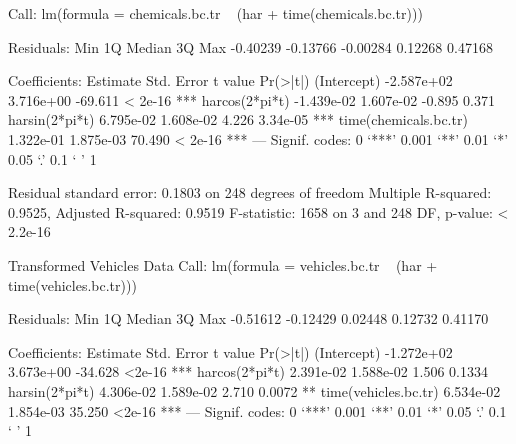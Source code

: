 \begin{enumerate}[label=(\roman*)]
\begin{block}
Call:
lm(formula = chemicals.bc.tr ~ (har + time(chemicals.bc.tr)))

Residuals:
     Min       1Q   Median       3Q      Max 
-0.40239 -0.13766 -0.00284  0.12268  0.47168 

Coefficients:
                        Estimate Std. Error t value Pr(>|t|)    
(Intercept)           -2.587e+02  3.716e+00 -69.611  < 2e-16 ***
harcos(2*pi*t)        -1.439e-02  1.607e-02  -0.895    0.371    
harsin(2*pi*t)         6.795e-02  1.608e-02   4.226 3.34e-05 ***
time(chemicals.bc.tr)  1.322e-01  1.875e-03  70.490  < 2e-16 ***
---
Signif. codes:  0 ‘***’ 0.001 ‘**’ 0.01 ‘*’ 0.05 ‘.’ 0.1 ‘ ’ 1

Residual standard error: 0.1803 on 248 degrees of freedom
Multiple R-squared:  0.9525,	Adjusted R-squared:  0.9519 
F-statistic:  1658 on 3 and 248 DF,  p-value: < 2.2e-16

Transformed Vehicles Data
Call:
lm(formula = vehicles.bc.tr ~ (har + time(vehicles.bc.tr)))

Residuals:
     Min       1Q   Median       3Q      Max 
-0.51612 -0.12429  0.02448  0.12732  0.41170 

Coefficients:
                       Estimate Std. Error t value Pr(>|t|)    
(Intercept)          -1.272e+02  3.673e+00 -34.628   <2e-16 ***
harcos(2*pi*t)        2.391e-02  1.588e-02   1.506   0.1334    
harsin(2*pi*t)        4.306e-02  1.589e-02   2.710   0.0072 ** 
time(vehicles.bc.tr)  6.534e-02  1.854e-03  35.250   <2e-16 ***
---
Signif. codes:  0 ‘***’ 0.001 ‘**’ 0.01 ‘*’ 0.05 ‘.’ 0.1 ‘ ’ 1


\end{block}
\end{enumerate}
